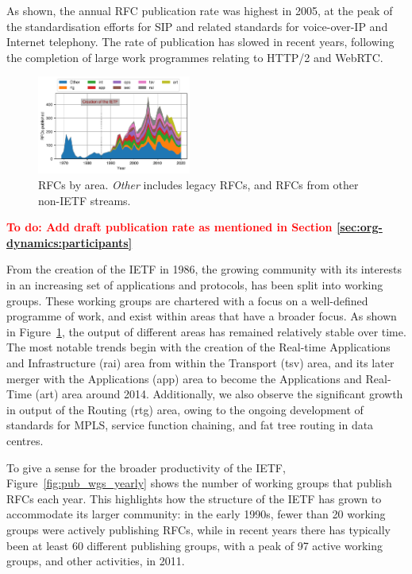\documentclass[twocolumn,10pt]{article}
\newcommand{\todo}[1]{\textbf{\textcolor{red}{To do: #1}}}
\newcommand{\pb}[1]{\vspace{0.75ex}\noindent{\textbf{#1}}}
\begin{document}
As shown, the annual RFC publication rate was highest in 2005, at the peak
of the standardisation efforts for SIP and related standards for voice-over-IP
and Internet telephony. The rate of publication has slowed in recent years,
following the completion of large work programmes relating to HTTP/2 and
WebRTC.

\begin{figure}
\includegraphics[width=0.45\textwidth]{figures-prev/imc-2021/documents/rfcs_areas.pdf}
\caption{RFCs by area. \textit{Other} includes legacy RFCs, and RFCs from other non-IETF streams.}
\label{fig:rfcs_by_area}
\end{figure}

\todo{Add draft publication rate as mentioned in Section \ref{sec:org-dynamics:participants}}

\pb{Role of Working Groups:}
From the creation of the IETF in 1986, the growing community with its
interests in an increasing set of applications and protocols, has been
split into working groups. These working groups are chartered with a focus
on a well-defined programme of work, and exist within areas that have a
broader focus.  As shown in Figure~\ref{fig:rfcs_by_area}, the output of
different areas has remained relatively stable over time. The most notable
trends begin with the creation of the Real-time Applications and
Infrastructure (rai) area from within the Transport (tsv) area, and its
later merger with the Applications (app) area to become the Applications
and Real-Time (art) area around 2014. Additionally, we also observe the
significant growth in output of the Routing (rtg) area, owing to the
ongoing development of standards for MPLS, service function chaining, and
fat tree routing in data centres.

To give a sense for the broader productivity of the IETF,
Figure~\ref{fig:pub_wgs_yearly} shows the number of working groups that
publish RFCs each year. This highlights how the structure of the IETF has
grown to accommodate its larger community: in the early 1990s, fewer than
20 working groups were actively publishing RFCs, while in recent years
there has typically been at least 60 different publishing groups, with a
peak of 97 active working groups, and other activities, in 2011.
\end{document}
